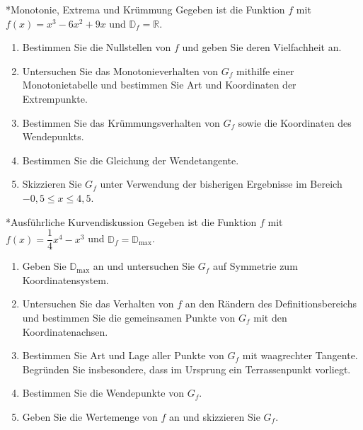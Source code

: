 \begin{uebung}*{Monotonie, Extrema und Krümmung}
Gegeben ist die Funktion $f$ mit $f(x) = x^3-6x^2+9x$ und $\mathds{D}_f = \mathds{R}$.
\begin{enumerate}[label=\alph*)]
  \item Bestimmen Sie die Nullstellen von $f$ und geben Sie deren Vielfachheit an.
  \item Untersuchen Sie das Monotonieverhalten von $G_f$ mithilfe einer Monotonietabelle und bestimmen Sie Art und Koordinaten der Extrempunkte.
  \item Bestimmen Sie das Krümmungsverhalten von $G_f$ sowie die Koordinaten des Wendepunkts.
  \item Bestimmen Sie die Gleichung der Wendetangente.
  \item Skizzieren Sie $G_f$ unter Verwendung der bisherigen Ergebnisse im Bereich $-0{,}5\leq x\leq 4{,}5$.
\end{enumerate}
\end{uebung}

\begin{uebung}*{Ausführliche Kurvendiskussion}
Gegeben ist die Funktion $f$ mit $f(x) = \dfrac{1}{4}x^4-x^3$ und $\mathds{D}_f = \mathds{D}_{\text{max}}$.
\begin{enumerate}[label=\alph*)]
  \item Geben Sie $\mathds{D}_{\text{max}}$ an und untersuchen Sie $G_f$ auf Symmetrie zum Koordinatensystem.
  \item Untersuchen Sie das Verhalten von $f$ an den Rändern des Definitionsbereichs und bestimmen Sie die gemeinsamen Punkte von $G_f$ mit den Koordinatenachsen.
  \item Bestimmen Sie Art und Lage aller Punkte von $G_f$ mit waagrechter Tangente. Begründen Sie insbesondere, dass im Ursprung ein Terrassenpunkt vorliegt.
  \item Bestimmen Sie die Wendepunkte von $G_f$.
  \item Geben Sie die Wertemenge von $f$ an und skizzieren Sie $G_f$.
\end{enumerate}
\end{uebung}

